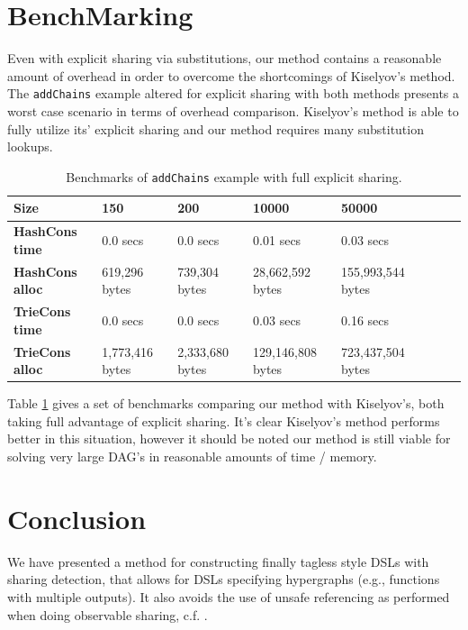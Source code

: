 \documentclass[runningheads]{llncs}
\begin{document}
\section{BenchMarking}

Even with explicit sharing via substitutions, our method contains a reasonable
amount of overhead in order to overcome the shortcomings of Kiselyov's method.
The \texttt{addChains} example altered for explicit sharing with
both methods presents a worst case scenario in terms of overhead comparison.
Kiselyov's method is able to fully utilize its' explicit sharing and our method
requires many substitution lookups.

\begin{table}
  \begin{tabular}{|l|l|l|l|l|l|l|l|}
    \hline
    {\bf Size } &  150 & 200 & 10000 & 50000 \\
    \hline
    {\bf HashCons time } &  0.0 secs & 0.0 secs & 0.01 secs & 0.03 secs \\
    {\bf HashCons alloc } &  619,296 bytes & 739,304 bytes & 28,662,592 bytes & 155,993,544 bytes \\
    {\bf TrieCons time } &   0.0 secs & 0.0 secs & 0.03 secs & 0.16 secs \\
    {\bf TrieCons alloc } &  1,773,416 bytes & 2,333,680 bytes & 129,146,808 bytes & 723,437,504 bytes \\
    \hline
  \end{tabular}

  \caption{Benchmarks of \texttt{addChains} example with full
    explicit sharing.}\label{tab1}
\end{table}

Table \ref{tab1} gives a set of benchmarks comparing our method with Kiselyov's,
both taking full advantage of explicit sharing. It's clear Kiselyov's method
performs better in this situation, however it should be noted our method is
still viable for solving very large DAG's in reasonable amounts of time / memory.

\section{Conclusion}
We have presented a method for constructing finally tagless style DSLs with
sharing detection, that allows for DSLs specifying hypergraphs (e.g., functions with multiple outputs).
It also avoids the use of unsafe referencing as performed when doing observable sharing, c.f. \cite{gill:observablesharing}.
\end{document}
